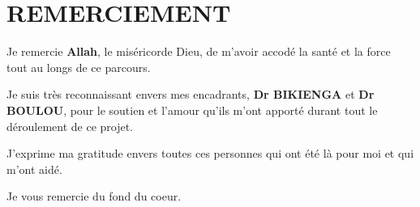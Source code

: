 \chapter*{REMERCIEMENT}
\thispagestyle{MyStyle}

 {\huge Je} remercie \textbf{Allah}, le miséricorde Dieu, de m'avoir accodé la santé et la force tout au longs de ce parcours.
 
 
 {\huge Je} suis très reconnaissant envers mes encadrants, \textbf{Dr BIKIENGA} et \textbf{Dr  BOULOU}, pour le soutien et l'amour qu'ils m'ont apporté durant tout le déroulement de ce projet. 
 
 {\huge J}'exprime ma gratitude envers toutes ces personnes qui ont été là pour moi et qui m'ont aidé.
 
 \vspace{1 cm}
 \hspace{8 cm}
 {\huge Je} vous remercie du fond du coeur.
 
